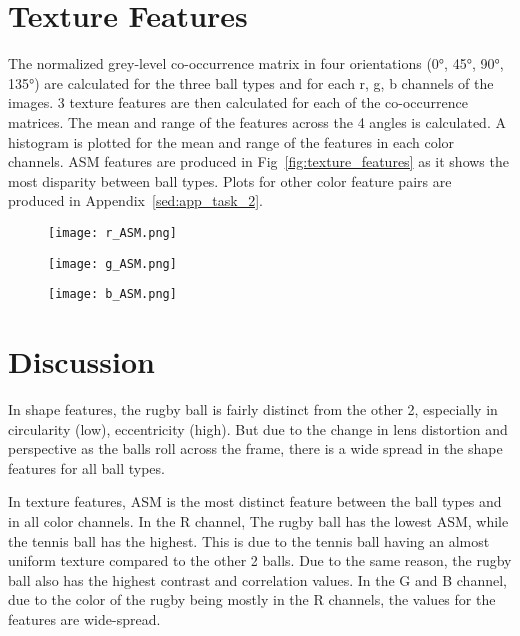 \documentclass{report}
\begin{document}
\section{Texture Features}

The normalized grey-level co-occurrence matrix in four orientations (0°, 45°, 90°, 135°) are calculated for the three ball types and for each r, g, b channels of the images. 3 texture features are then calculated for each of the co-occurrence matrices. The mean and range of the features across the 4 angles is calculated. A histogram is plotted for the mean and range of the features in each color channels. ASM features are produced in Fig~\ref{fig:texture_features} as it shows the most disparity between ball types. Plots for other color feature pairs are produced in Appendix~\ref{sed:app_task_2}.

\begin{figure}
    \texttt{[image: r\_ASM.png]}
    \label{fig:r_ASM}
\end{figure}

\begin{figure}
    \texttt{[image: g\_ASM.png]}
    \label{fig:g_ASM}
\end{figure}

\begin{figure}
    \texttt{[image: b\_ASM.png]}
    \label{fib:g_ASM}
\end{figure}

\section{Discussion}

In shape features, the rugby ball is fairly distinct from the other 2, especially in circularity (low), eccentricity (high). But due to the change in lens distortion and perspective as the balls roll across the frame, there is a wide spread in the shape features for all ball types.

In texture features, ASM is the most distinct feature between the ball types and in all color channels. In the R channel, The rugby ball has the lowest ASM, while the tennis ball has the highest. This is due to the tennis ball having an almost uniform texture compared to the other 2 balls. Due to the same reason, the rugby ball also has the highest contrast and correlation values. In the G and B channel, due to the color of the rugby being mostly in the R channels, the values for the features are wide-spread.
\end{document}
